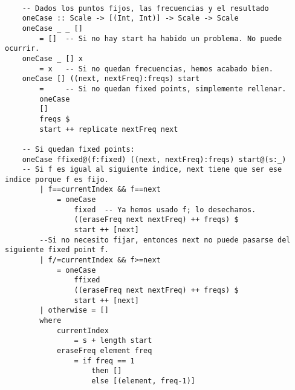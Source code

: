 \begin{lstlisting}
	
	-- Dados los puntos fijos, las frecuencias y el resultado
	oneCase :: Scale -> [(Int, Int)] -> Scale -> Scale
	oneCase _ _ []
		= []  -- Si no hay start ha habido un problema. No puede ocurrir.
	oneCase _ [] x
		= x   -- Si no quedan frecuencias, hemos acabado bien.
	oneCase [] ((next, nextFreq):freqs) start
		=     -- Si no quedan fixed points, simplemente rellenar.
		oneCase
		[]
		freqs $
		start ++ replicate nextFreq next
	
	-- Si quedan fixed points:
	oneCase ffixed@(f:fixed) ((next, nextFreq):freqs) start@(s:_)
	-- Si f es igual al siguiente indice, next tiene que ser ese indice porque f es fijo.
		| f==currentIndex && f==next
			= oneCase
				fixed  -- Ya hemos usado f; lo desechamos.
				((eraseFreq next nextFreq) ++ freqs) $
				start ++ [next]
		--Si no necesito fijar, entonces next no puede pasarse del siguiente fixed point f.
		| f/=currentIndex && f>=next
			= oneCase
				ffixed
				((eraseFreq next nextFreq) ++ freqs) $
				start ++ [next]
		| otherwise = []
		where
			currentIndex
				= s + length start
			eraseFreq element freq
				= if freq == 1
					then []
					else [(element, freq-1)]	

	\end{lstlisting}